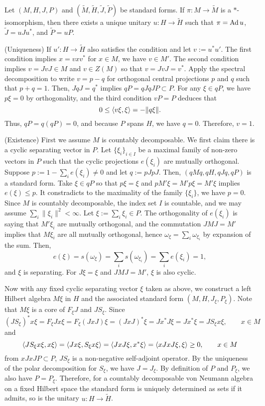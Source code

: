 \documentclass{../../../small}
\begin{document}
\begin{prop}[Uniqueness]
Let $(M,H,J,P)$ and $(\tilde M,\tilde H,\tilde J,\tilde P)$ be standard forms.
If $\pi:M\to\tilde M$ is a $*$-isomorphism, then there exists a unique unitary $u:H\to\tilde H$ such that $\pi=\operatorname{Ad} u$, $\tilde J=uJu^*$, and $\tilde P=uP$.
\end{prop}
\begin{pf}
(Uniqueness)
If $u':H\to \tilde H$ also satisfies the condition and let $v:=u^*u'$.
The first condition implies $x=vxv^*$ for $x\in M$, we have $v\in M'$.
The second condition implies $v=JvJ\in M$ and $v\in Z(M)$ so that $v=JvJ=v^*$.
Apply the spectral decomposition to write $v=p-q$ for orthogonal central projections $p$ and $q$ such that $p+q=1$.
Then, $JqJ=q^*$ implies $qP=qJqJP\subset P$.
For any $\xi\in qP$, we have $p\xi=0$ by orthogonality, and the third condition $vP=P$ deduces that
\[0\le\langle v\xi,\xi\rangle=-\|q\xi\|.\]
Thus, $qP=q(qP)=0$, and because $P$ spans $H$, we have $q=0$.
Therefore, $v=1$.

(Existence)
First we assume $M$ is countably decomposable.
We first claim there is a cyclic separating vector in $P$.
Let $\{\xi_i\}_{i\in I}$ be a maximal family of non-zero vectors in $P$ such that the cyclic projections $e(\xi_i)$ are mutually orthogonal.
Suppose $p:=1-\sum_ie(\xi_i)\ne0$ and let $q:=pJpJ$.
Then, $(qMq,qH,qJq,qP)$ is a standard form.
Take $\xi\in qP$ so that $p\xi=\xi$ and $pM'\xi=M'p\xi=M'\xi$ implies $e(\xi)\le p$.
It constradicts to the maximality of the family $\{\xi_i\}$, we have $p=0$.
Since $M$ is countably decomposable, the index set $I$ is countable, and we may assume $\sum_i\|\xi_i\|^2<\infty$.
Let $\xi:=\sum_i\xi_i\in P$.
The orthogonality of $e(\xi_i)$ is saying that $M'\xi_i$ are mutually orthogonal, and the commutation $JMJ=M'$ implies that $M\xi_i$ are all mutually orthogonal, hence $\omega_\xi=\sum_i\omega_{\xi_i}$ by expansion of the sum.
Then,
\[e(\xi)=s(\omega_\xi)=\sum_is(\omega_{\xi_i})=\sum_ie(\xi_i)=1,\]
and $\xi$ is separating.
For $J\xi=\xi$ and $JMJ=M'$, $\xi$ is also cyclic.

Now with any fixed cyclic separating vector $\xi$ taken as above, we construct a left Hilbert algebra $M\xi$ in $H$ and the associated standard form $(M,H,J_\xi,P_\xi)$.
Note that $M\xi$ is a core of $F_\xi J$ and $JS_\xi$.
Since
\[(JS_\xi)^*x\xi=F_\xi Jx\xi=F_\xi(JxJ)\xi=(JxJ)^*\xi=Jx^*J\xi=Jx^*\xi=JS_\xi x\xi,\qquad x\in M\]
and
\[\langle JS_\xi x\xi,x\xi\rangle=\langle Jx\xi,S_\xi x\xi\rangle=\langle JxJ\xi,x^*\xi\rangle=\langle xJxJ\xi,\xi\rangle\ge0,\qquad x\in M\]
from $xJxJP\subset P$, $JS_\xi$ is a non-negative self-adjoint operator.
By the uniqueness of the polar decomposition for $S_\xi$, we have $J=J_\xi$.
By definition of $P$ and $P_\xi$, we also have $P=P_\xi$.
Therefore, for a countably decomposable von Neumann algebra on a fixed Hilbert space the standard form is uniquely determined as sets if it admits, so is the unitary $u:H\to\tilde H$.


\end{pf}
\end{document}
